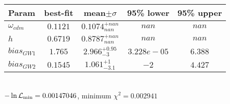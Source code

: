 \begin{tabular}{|l|c|c|c|c|} 
 \hline 
Param & best-fit & mean$\pm\sigma$ & 95\% lower & 95\% upper \\ \hline 
$\omega_{cdm }$ &$0.1121$ & $0.1074_{nan}^{+nan}$ & $nan$ & $nan$ \\ 
$h$ &$0.6719$ & $0.8787_{nan}^{+nan}$ & $nan$ & $nan$ \\ 
$bias_{GW 1 }$ &$1.765$ & $2.966_{-3}^{+0.95}$ & $3.228e-05$ & $6.388$ \\ 
$bias_{GW 2 }$ &$0.1545$ & $1.061_{-3.1}^{+1}$ & $-2$ & $4.427$ \\ 
\hline 
 \end{tabular} \\ 
$-\ln{\cal L}_\mathrm{min} =0.00147046$, minimum $\chi^2=0.002941$ \\ 
